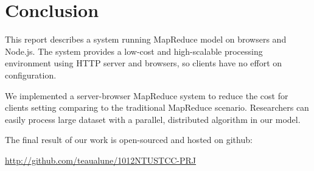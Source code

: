 \section{Conclusion}

This report describes a system running MapReduce model on browsers and Node.js.
The system provides a low-cost and high-scalable processing environment using HTTP server and browsers, so clients have no effort on configuration.

We implemented a server-browser MapReduce system to reduce the cost for clients setting comparing to the traditional MapReduce scenario.
Researchers can easily process large dataset with a parallel, distributed algorithm in our model.

The final result of our work is open-sourced and hosted on github:

\url{http://github.com/teaualune/1012NTUSTCC-PRJ}
